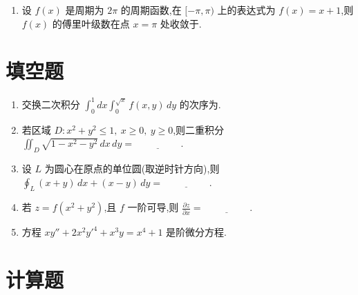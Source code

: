 \begin{enumerate}
	\item 设 $f(x)$ 是周期为 $2\pi$ 的周期函数,在 $[-\pi,\pi)$ 上的表达式为 $f(x)=x+1$,则 $f(x)$ 的傅里叶级数在点 $x=\pi$ 处收敛于\underline{\hspace{2cm}}.
\end{enumerate}

\section{填空题}

\begin{enumerate}
	\item 交换二次积分
	$
	\int_0^1 dx\int_0^{\sqrt{x}} f(x,y)\,dy
	$
	的次序为\underline{\hspace{2cm}}.
	
	\item 若区域 $D:x^2+y^2\le 1,\ x\ge 0,\ y\ge 0$,则二重积分
	$
	\iint_D \sqrt{1-x^2-y^2}\,dx\,dy=\underline{\hspace{2cm}}.
	$
	
	\item 设 $L$ 为圆心在原点的单位圆(取逆时针方向),则
	$
	\oint_L (x+y)\,dx+(x-y)\,dy=\underline{\hspace{2cm}}.
	$
	
	\item 若 $z=f(x^2+y^2)$,且 $f$ 一阶可导,则
	$
	\frac{\partial z}{\partial x}=\underline{\hspace{2cm}}.
	$
	
	\item 方程
	$
	xy''+2x^2y'^4+x^3y=x^4+1
	$
	是\underline{\hspace{2cm}}阶微分方程.
\end{enumerate}

\section{计算题}

